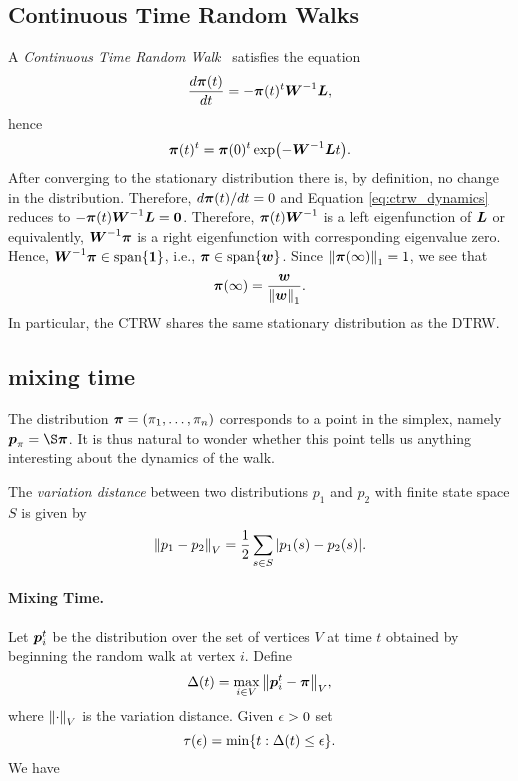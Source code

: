 \subsection{Continuous Time Random Walks}

A \emph{Continuous Time Random Walk}~\cite{masuda2017random} satisfies the equation 
\begin{equation}
\label{eq:ctrw_dynamics}
    \frac{d\boldsymbol{\pi}(t)}{dt}= -\boldsymbol{\pi}(t)^t\vb*{W}^{-1} \vb*{L},
\end{equation}
hence 
\begin{equation*}
    \boldsymbol{\pi}(t)^t = \boldsymbol{\pi}(0)^t \exp(-\vb*{W}^{-1}\vb*{L} t).
\end{equation*}
After converging to the stationary distribution there is, by definition, no change in the distribution. Therefore, $d\boldsymbol{\pi}(t)/dt=0$ and Equation \eqref{eq:ctrw_dynamics} reduces to 
$-\boldsymbol{\pi}(t)\vb*{W}^{-1}\vb*{L} =\vb{0}$. Therefore, $\boldsymbol{\pi}(t)\vb*{W}^{-1}$ is a left eigenfunction of $\vb*{L}$ or equivalently, $ \vb*{W}^{-1}\boldsymbol{\pi}$ is a right eigenfunction with corresponding eigenvalue zero. Hence, $\vb*{W}^{-1}\boldsymbol{\pi}\in\textnormal{span}\{\vb{1}\}$, i.e., $\boldsymbol{\pi}\in\textnormal{span}\{\vb*{w}\}$. Since $\norm{\boldsymbol{\pi}(\infty)}_1=1$, we see that 
\[\boldsymbol{\pi}(\infty) = \frac{\vb*{w}}{\norm{\vb*{w}}_1}.\]
In particular, the CTRW shares the same stationary distribution as the DTRW. 



\subsection{mixing time}
The distribution $\boldsymbol{\pi}=(\pi_1,\dots,\pi_n)$ corresponds to a point in the simplex, namely $\p_\pi=\S\bpi$. It is thus natural to wonder whether this point tells us anything interesting about the dynamics of the walk. 

The \emph{variation distance} between two distributions $p_1$ and $p_2$ with finite state space $S$ is given by 
\[\norm{p_1-p_2}_V = \frac{1}{2}\sum_{s\in S} |p_1(s)-p_2(s)|.\]

\paragraph{Mixing Time.} Let $\vb*{p}_i^t$ be the distribution over the set of vertices $V$ at time $t$ obtained by beginning the random walk at vertex $i$. Define 
\[\Delta(t) = \max_{i\in V}\norm{\vb*{p}_i^t-\boldsymbol{\pi}}_V,\]
where $\norm{\cdot}_V$ is the variation distance. Given $\epsilon>0$ set 
\[\tau(\epsilon) = \min\{t:\Delta(t)\leq \epsilon\}.\]
We have 
